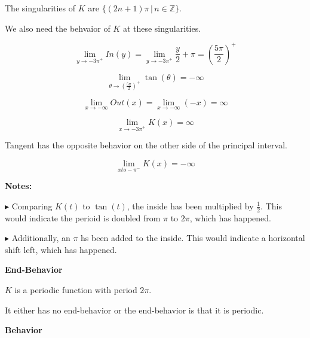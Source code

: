 \documentclass{ximera}
\begin{document}
{{The singularities of $K$ are $\{ (2n+1)\pi  \, | \, n \in \mathbb{Z}  \}$. 



We also need the behvaior of $K$ at these singularities. 



\[
\lim\limits_{y \to -3\pi^+} In(y) = \lim\limits_{y \to -3\pi^+} \frac{y}{2} + \pi = \left( \frac {5\pi}{2} \right)^+
\]




\[
\lim\limits_{\theta \to \left( \tfrac {5\pi}{2} \right)^+} \tan(\theta) = -\infty
\]




\[
\lim\limits_{x \to -\infty} Out(x) = \lim\limits_{x \to -\infty} (-x) = \infty
\]





\[
\lim\limits_{x \to -3\pi^+} K(x) = \infty
\]


Tangent has the opposite behavior on the other side of the principal interval. 






\[
\lim\limits_{x to -\pi^-} K(x) = -\infty
\]




\textbf{Notes:} 


$\blacktriangleright$ Comparing $K(t)$ to $\tan(t)$, the inside has been multiplied by $\frac{1}{2}$.  This would indicate the perioid is doubled from $\pi$ to $2\pi$, which has happened.  

$\blacktriangleright$ Additionally, an $\pi$ hs been added to the inside.  This would indicate a horizontal shift left, which has happened.














\textbf{\textcolor{blue!55!black}{End-Behavior}}


$K$ is a periodic function with period $2\pi$. 

It either has no end-behavior or the end-behavior is that it is periodic.











\textbf{\textcolor{blue!55!black}{Behavior}}


}}
\end{document}
